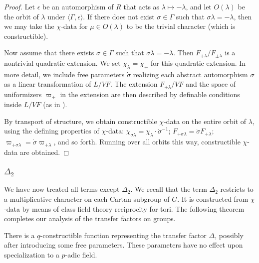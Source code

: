 \begin{proof}
Let $\epsilon$ be an automorphism of $R$ that acts as $\lambda\mapsto
-\lambda$, and let $O(\lambda)$ be the orbit of $\lambda$ under
$\langle\Gamma,\epsilon\rangle$.  If there does not exist
$\sigma\in\Gamma$ such that $\sigma\lambda=-\lambda$, then we may take
the $\chi$-data for $\mu\in O(\lambda)$ to be the trivial character
(which is constructible).

Now assume that there exists $\sigma\in\Gamma$ such that
$\sigma\lambda = -\lambda$.  Then $F_{+\lambda}/F_{\pm \lambda}$ is a
nontrivial quadratic extension.  We set $\chi_\lambda = \chi_+$ for
this quadratic extension.  In more detail, we include free parameters
$\dot\sigma$ realizing each abstract automorphism $\sigma$ as a
linear transformation of $L/VF$.  The extension $F_{+\lambda}/VF$ and
the space of uniformizers $\varpi_+$ in the extension are then
described by definable conditions inside $L/VF$ (as in
\cite{cluckers2011transfer}).

By transport of structure, we obtain constructible $\chi$-data on the
entire orbit of $\lambda$, using the defining properties of
$\chi$-data: $\chi_{\sigma\lambda} = \chi_{\lambda}\cdot
\dot\sigma^{-1}$; $F_{+\sigma\lambda}=\dot\sigma F_{+\lambda}$;
$\varpi_{+\sigma\lambda}=\dot\sigma\varpi_{+\lambda}$, and so forth.
Running over all orbits this way, constructible $\chi$-data are
obtained.
\end{proof}


\subsubsection{$\Delta_2$}

We have now treated all terms except $\Delta_2$.  We recall that the
term $\Delta_2$ restricts to a multiplicative character on each Cartan
subgroup of $G$.  It is constructed from $\chi$-data by means of class
field theory reciprocity for tori.  The following theorem completes
our analysis of the transfer factors on groups.

\begin{theorem}\label{thm:delta2}  
  There is a $q$-constructible function representing the transfer
  factor $\Delta$, possibly after introducing some free parameters.
  These parameters have no effect upon specialization to a $p$-adic
  field.
\end{theorem}


